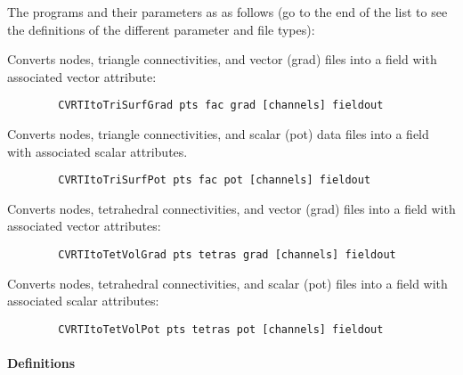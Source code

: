The programs and their parameters as as follows (go to the end of the list
to see the definitions of the different parameter and file types):
%
\begin{description}
   Converts nodes, triangle connectivities, and
        vector (grad) files into a field with associated vector attribute:\\
        \begin{verbatim}
        CVRTItoTriSurfGrad pts fac grad [channels] fieldout
        \end{verbatim}
   Converts nodes, triangle connectivities, and
        scalar (pot) data files into a field with associated scalar
        attributes. 
        \begin{verbatim}
        CVRTItoTriSurfPot pts fac pot [channels] fieldout
        \end{verbatim}
   Converts nodes, tetrahedral connectivities, and
        vector (grad) files into a field with associated vector
        attributes:\\
        \begin{verbatim}
        CVRTItoTetVolGrad pts tetras grad [channels] fieldout
        \end{verbatim}
   Converts nodes, tetrahedral connectivities, and
        scalar (pot) files into a field with associated scalar attributes:\\
        \begin{verbatim}
        CVRTItoTetVolPot pts tetras pot [channels] fieldout
        \end{verbatim}
\end{description}

\paragraph{Definitions}


